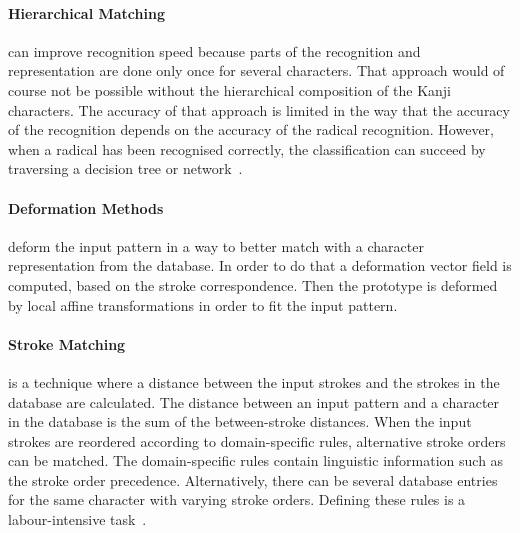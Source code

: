 \paragraph{Hierarchical Matching} can improve recognition speed because parts 
of the recognition and representation are done only once for several characters.
That approach would of course not be possible without the hierarchical 
composition of the Kanji characters. The accuracy of that approach is limited in
the way that the accuracy of the recognition depends on the accuracy of the
radical recognition. However, when a radical has been recognised correctly, 
the classification can succeed by traversing a decision tree or 
network~.

\paragraph{Deformation Methods} deform the input pattern in a way to better match
with a character representation from the database. In order to do that a 
deformation vector field is computed, based on the stroke correspondence.
Then the prototype is deformed by local affine transformations in order to fit 
the input pattern.

\paragraph{Stroke Matching} is a technique where a distance between the input 
strokes and the strokes in the database are calculated. The distance between an
input pattern and a character in the database is the sum of the between-stroke
distances. When the input strokes are reordered according to domain-specific 
rules, alternative stroke orders can be matched. The domain-specific rules 
contain linguistic information such as the stroke order precedence.
Alternatively, there can be several database entries for the same character with
varying stroke orders. Defining these rules is a labour-intensive 
task~.

